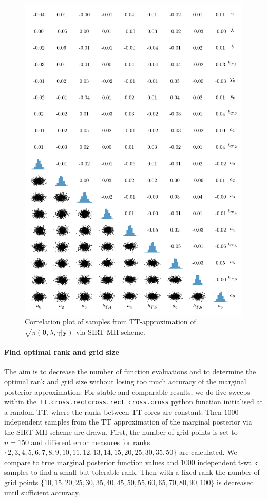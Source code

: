 \begin{figure}%
	\includegraphics[]{2ndCorrPlot.png}
	\caption*{Correlation plot of samples from TT-approximation of $\sqrt{\pi(\bm{\theta},\lambda,\gamma | \bm{y})}$ via SIRT-MH scheme.}
\end{figure}
\clearpage


\paragraph{Find optimal rank and grid size}
The aim is to decrease the number of function evaluations and to determine the optimal rank and grid size without losing too much accuracy of the marginal posterior approximation.
For stable and comparable results, we do five sweeps within \linebreak the~\texttt{tt.cross.rectcross.rect\_cross.cross} python function initialised at a random TT, where the ranks between TT cores are constant.
Then $1000$ independent samples from the TT approximation of the marginal posterior via the SIRT-MH scheme are drawn. 
First, the number of grid points is set to $n = 150$ and different error measures for ranks $\{2,3,4,5,6,7,8,9,10,11,12,13,14,15, 20, 25, 30, 35, 50\}$ are calculated.
We compare to true marginal posterior function values and $1000$ independent t-walk samples to find a small but tolerable rank.
Then with a fixed rank the number of grid points $\{10, 15, 20, 25, 30, 35, 40, 45, 50, 55, 60, 65, 70, 80, 90, 100\}$ is decreased until sufficient accuracy.

